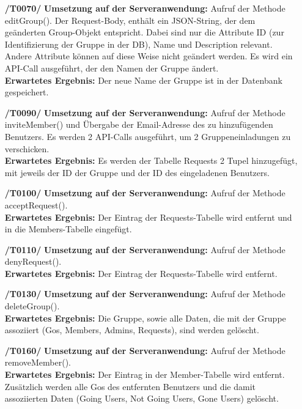 \documentclass[11pt,a4paper]{scrartcl}
\begin{document}
\begin{enumerate}
	\item[\textbf{/T0070/}]
	\textbf{Umsetzung auf der Serveranwendung: }Aufruf der Methode editGroup(). Der Request-Body, enthält ein JSON-String, der dem geänderten Group-Objekt entspricht. Dabei sind nur die Attribute ID (zur Identifizierung der Gruppe in der DB), Name und Description relevant. Andere Attribute können auf diese Weise nicht geändert werden. Es wird ein API-Call ausgeführt, der den Namen der Gruppe ändert.\\
	\textbf{Erwartetes Ergebnis: }Der neue Name der Gruppe ist in der Datenbank gespeichert.
	
	\item[\textbf{/T0090/}]
	\textbf{Umsetzung auf der Serveranwendung: }Aufruf der Methode inviteMember() und Übergabe der Email-Adresse des zu hinzufügenden Benutzers. Es werden 2 API-Calls ausgeführt, um 2 Gruppeneinladungen zu verschicken.\\
	\textbf{Erwartetes Ergebnis: }Es werden der Tabelle Requests 2 Tupel hinzugefügt, mit jeweils der ID der Gruppe und der ID des eingeladenen Benutzers.
	
	\item[\textbf{/T0100/}]
	\textbf{Umsetzung auf der Serveranwendung: }Aufruf der Methode acceptRequest().\\
	\textbf{Erwartetes Ergebnis: }Der Eintrag der Requests-Tabelle wird entfernt und in die Members-Tabelle eingefügt.
	
	\item[\textbf{/T0110/}]
	\textbf{Umsetzung auf der Serveranwendung: }Aufruf der Methode denyRequest().\\
	\textbf{Erwartetes Ergebnis: }Der Eintrag der Requests-Tabelle wird entfernt.
	
	\item[\textbf{/T0130/}] \label{T130} 
	\textbf{Umsetzung auf der Serveranwendung: }Aufruf der Methode deleteGroup().\\
	\textbf{Erwartetes Ergebnis: }Die Gruppe, sowie alle Daten, die mit der Gruppe assoziiert (Gos, Members, Admins, Requests), sind werden gelöscht.
	
	\item[\textbf{/T0160/}]
	\textbf{Umsetzung auf der Serveranwendung: }Aufruf der Methode removeMember().\\
	\textbf{Erwartetes Ergebnis: }Der Eintrag in der Member-Tabelle wird entfernt. Zusätzlich werden alle Gos des entfernten Benutzers und die damit assoziierten Daten (Going Users, Not Going Users, Gone Users) gelöscht.
	

\end{enumerate}
\end{document}
